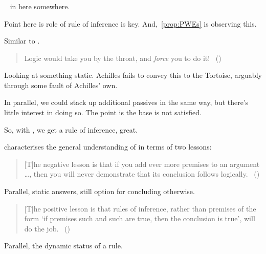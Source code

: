 \subsubsection{}
\label{sec:carroll}

\begin{note}
  \color{red}

  ~\cite{Besson:2018wz} in here somewhere.
\end{note}

\begin{note}
  \color{red}
  Point here is role of rule of inference is key.
  And,~\autoref{prop:PWEs} is observing this.
\end{note}

\begin{note}
  Similar to \citeauthor{Carroll:1895uj}.
  \begin{quote}
    Logic would take you by the throat, and \emph{force} you to do it!%
    \mbox{ }\hfill\mbox{(\citeyear[280]{Carroll:1895uj})}
  \end{quote}
  Looking at something static.
  Achilles fails to convey this to the Tortoise, arguably through some fault of Achilles' own.

  In parallel, we could stack up additional passives in the same way, but there's little interest in doing so.
  The point is the base \requ{} is not satisfied.
\end{note}

\begin{note}
  So, with \citeauthor{Carroll:1895uj}, we get a rule of inference, great.

  \citeauthor{Wieland:2013vf} characterises the general understanding of \textcite{Carroll:1895uj} in terms of two lessons:
  \begin{quote}
    [T]he negative lesson is that if you add ever more premises to an argument \dots, then you will never demonstrate that its conclusion follows logically.%
    \mbox{ }\hfill\mbox{(\citeyear[984]{Wieland:2013vf})}
  \end{quote}

  Parallel, static answers, still option for concluding otherwise.

  \begin{quote}
    [T]he positive lesson is that rules of inference, rather than premises of the form `if premises such and such are true, then the conclusion is true', will do the job.%
    \mbox{ }\hfill\mbox{(\citeyear[984]{Wieland:2013vf})}
  \end{quote}

  Parallel, the dynamic status of a rule.
\end{note}

